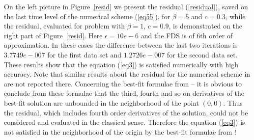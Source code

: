 \documentclass[preprint]{elsarticle}
\newcommand{\rf}[1]{(\ref{#1})}
\begin{document}
On the left picture in Figure~\ref{resid} we present  the residual \rf{residual}, saved on the last time level of the numerical scheme \rf{eq55},  for $\beta = 5$ and $c = 0.3$, while the residual, evaluated for problem with $\beta = 1$, $c = 0.9$, is demonstrated on the right part of Figure~\ref{resid}. Here  $\epsilon =10e-6$ and the FDS is of 6th order of approximation. In these cases the difference between the last two iterations is $3.7749e-007$ for the first data set and $1.2726e-007$ for the second data set. These results show that the  equation \rf{eq3} is satisfied numerically with high accuracy. 
Note that similar results about the residual for the numerical scheme in \cite{Ch2012} are not reported there. Concerning the best-fit formulae from \cite{Ch2011} -- it is obvious to conclude from these formulae that the third, fourth and so on  derivatives of the best-fit solution are unbounded in the neighborhood of the point $(0,0)$. Thus  
the residual, which includes fourth order derivatives of the solution, could not be considered and evaluated in the classical sense. Therefore the equation \rf{eq3} is not satisfied in the neighborhood of the origin by the best-fit formulae  from \cite{Ch2011}!
\end{document}
